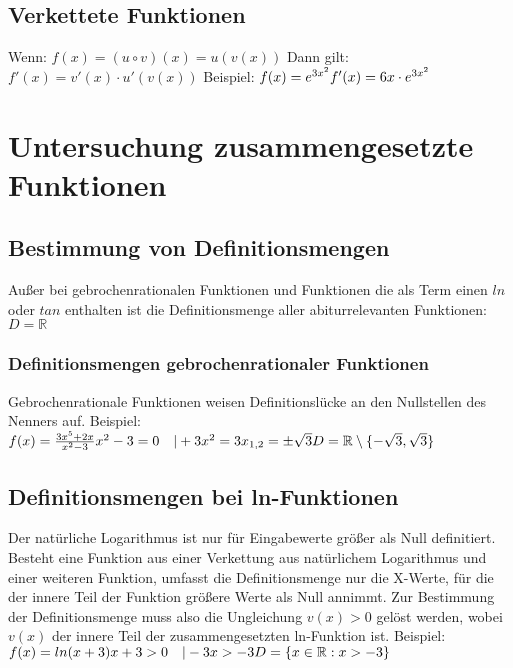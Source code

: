 \documentclass{article}
\begin{document}
    \subsection*{Verkettete Funktionen}
    Wenn: \break
    $f(x) = (u \circ v)(x) = u(v(x))$
    \break
    Dann gilt:\break
    $f'(x) = v'(x) \cdot u'(v(x))$
    \break \break
    Beispiel: \break \break
        $f(x) = e^{3x^2} \break f'(x) = 6x \cdot e^{3x^2}$

    \pagebreak

\section*{Untersuchung zusammengesetzte Funktionen}
\subsection*{Bestimmung von Definitionsmengen}
Außer bei gebrochenrationalen Funktionen und Funktionen die als Term einen $ln$ oder $tan$
enthalten ist die Definitionsmenge aller abiturrelevanten Funktionen: $D = \mathbb{R}$
    \subsubsection*{Definitionsmengen gebrochenrationaler Funktionen}
    Gebrochenrationale Funktionen weisen Definitionslücke an den Nullstellen des Nenners auf.
    \break \break
    Beispiel: \break \break
    $f(x) = \frac{3x^5+2x}{x^2-3} \break \break
    x^2-3 = 0 \quad |+3 \break
    x^2 = 3 \break
    x_{1,2} = \pm\sqrt{3} \break \break
    D = \mathbb{R} \setminus \{ -\sqrt{3},\sqrt{3} \}
    $

    \subsection*{Definitionsmengen bei ln-Funktionen}
    Der natürliche Logarithmus ist nur für Eingabewerte größer als Null definitiert.
    Besteht eine Funktion aus einer Verkettung aus natürlichem Logarithmus und einer weiteren Funktion,
    umfasst die Definitionsmenge nur die X-Werte, für die der innere Teil der Funktion größere Werte als Null annimmt.
    Zur Bestimmung der Definitionsmenge muss also die Ungleichung $v(x) > 0$ gelöst werden, wobei $v(x)$ der innere Teil der zusammengesetzten ln-Funktion ist.
    \break \break
    Beispiel:\break \break
    $
    f(x) = ln(x+3) \break \break
    x+3 > 0 \quad |-3 \break
    x > -3 \break \break
    D = \{x \in \mathbb{R}: x > -3\}
    $
    
\end{document}
